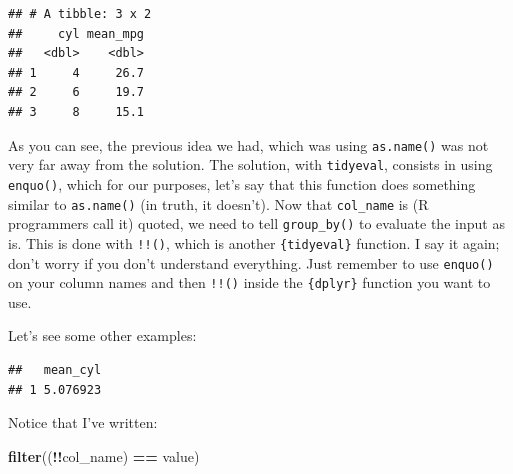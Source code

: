 \documentclass[]{gitbook}
\newenvironment{Shaded}{\begin{snugshade}}{\end{snugshade}}
\newcommand{\ControlFlowTok}[1]{\textcolor[rgb]{0.13,0.29,0.53}{\textbf{#1}}}
\newcommand{\DataTypeTok}[1]{\textcolor[rgb]{0.13,0.29,0.53}{#1}}
\newcommand{\DecValTok}[1]{\textcolor[rgb]{0.00,0.00,0.81}{#1}}
\newcommand{\KeywordTok}[1]{\textcolor[rgb]{0.13,0.29,0.53}{\textbf{#1}}}
\newcommand{\NormalTok}[1]{#1}
\newcommand{\OperatorTok}[1]{\textcolor[rgb]{0.81,0.36,0.00}{\textbf{#1}}}
\newcommand{\StringTok}[1]{\textcolor[rgb]{0.31,0.60,0.02}{#1}}
\begin{document}
\begin{verbatim}
## # A tibble: 3 x 2
##     cyl mean_mpg
##   <dbl>    <dbl>
## 1     4     26.7
## 2     6     19.7
## 3     8     15.1
\end{verbatim}

As you can see, the previous idea we had, which was using \texttt{as.name()} was not very far away from
the solution. The solution, with \texttt{tidyeval}, consists in using \texttt{enquo()}, which for our purposes,
let's say that this function does something similar to \texttt{as.name()} (in truth, it doesn't). Now that
\texttt{col\_name} is (R programmers call it) quoted, we need to tell \texttt{group\_by()} to evaluate the input as
is. This is done with \texttt{!!()}, which is another \texttt{\{tidyeval\}} function. I say it again;
don't worry if you don't understand everything. Just remember to use \texttt{enquo()} on your column names
and then \texttt{!!()} inside the \texttt{\{dplyr\}} function you want to use.

Let's see some other examples:

\begin{Shaded}
\end{Shaded}

\begin{verbatim}
##   mean_cyl
## 1 5.076923
\end{verbatim}

Notice that I've written:

\begin{Shaded}
\begin{Highlighting}[]
\KeywordTok{filter}\NormalTok{((}\OperatorTok{!!}\NormalTok{col_name) }\OperatorTok{==}\StringTok{ }\NormalTok{value)}
\end{Highlighting}
\end{Shaded}
\end{document}

